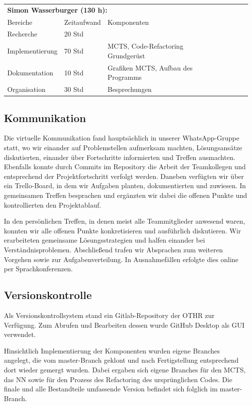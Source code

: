 \documentclass[12pt,a4paper]{article}
\begin{document}
\begin{tabular}{*{3}{p{4cm}p{3cm}p{8cm}}}
\multicolumn{3}{l}{\textbf{Simon Wasserburger (130 h):}} \\
Bereiche & Zeitaufwand & Komponenten \\
\cline{1-3}
Recherche & 20 Std &  \\
Implementierung & 70 Std & MCTS, Code-Refactoring Grundgerüst  \\
Dokumentation & 10 Std &  Grafiken MCTS, Aufbau des Programms \\
Organisation & 30 Std &  Besprechungen\\
\end{tabular}

\subsection{Kommunikation}
Die virtuelle Kommunikation fand hauptsächlich in unserer WhatsApp-Gruppe statt, wo wir einander auf Problemstellen aufmerksam machten, Lösungsansätze diskutierten, einander über Fortschritte informierten und Treffen ausmachten. Ebenfalls konnte durch Commits im Repository die Arbeit der Teamkollegen und entsprechend der Projektfortschritt verfolgt werden. Daneben verfügten wir über ein Trello-Board, in dem wir Aufgaben planten, dokumentierten und zuwiesen. In gemeinsamen Treffen besprachen und ergänzten wir dabei die offenen Punkte und kontrollierten den Projektablauf. 

In den persönlichen Treffen, in denen meist alle Teammitglieder anwesend waren, konnten wir alle offenen Punkte konkretisieren und ausführlich diskutieren. Wir erarbeiteten gemeinsame Lösungsstrategien und halfen einander bei Verständnisproblemen. Abschließend trafen wir Absprachen zum weiteren Vorgehen sowie zur Aufgabenverteilung. In Ausnahmefällen erfolgte dies online per Sprachkonferenzen.

\subsection{Versionskontrolle}
Als Versionskontrollsystem stand ein Gitlab-Repository der OTHR zur Verfügung. Zum Abrufen und Bearbeiten dessen wurde GitHub Desktop als GUI verwendet.

Hinsichtlich Implementierung der Komponenten wurden eigene Branches angelegt, die vom master-Branch geklont und nach Fertigstellung entsprechend dort wieder gemergt wurden. Dabei ergaben sich eigene Branches für den MCTS, das NN sowie für den Prozess des Refactoring des ursprünglichen Codes. Die finale und alle Bestandteile umfassende Version befindet sich folglich im master-Branch.
\end{document}
